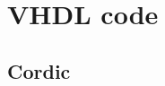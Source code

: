 \chapter{VHDL code}


\section{Cordic}

\begin{code}
    \inputminted{vhdl}{listings/03/CORDIC.vhd}
    \label{code:test}
\end{code}
